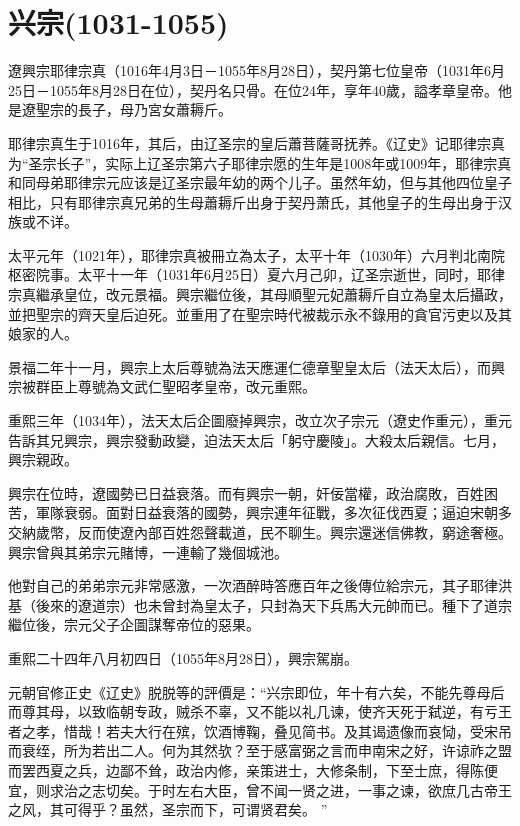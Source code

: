 
\section{兴宗\tiny(1031-1055)}

遼興宗耶律宗真（1016年4月3日－1055年8月28日），契丹第七位皇帝（1031年6月25日－1055年8月28日在位），契丹名只骨。在位24年，享年40歲，謚孝章皇帝。他是遼聖宗的長子，母乃宮女蕭耨斤。

耶律宗真生于1016年，其后，由辽圣宗的皇后蕭菩薩哥抚养。《辽史》记耶律宗真为“圣宗长子”，实际上辽圣宗第六子耶律宗愿的生年是1008年或1009年，耶律宗真和同母弟耶律宗元应该是辽圣宗最年幼的两个儿子。虽然年幼，但与其他四位皇子相比，只有耶律宗真兄弟的生母蕭耨斤出身于契丹萧氏，其他皇子的生母出身于汉族或不详。

太平元年（1021年），耶律宗真被冊立為太子，太平十年（1030年）六月判北南院枢密院事。太平十一年（1031年6月25日）夏六月己卯，辽圣宗逝世，同时，耶律宗真繼承皇位，改元景福。興宗繼位後，其母順聖元妃蕭耨斤自立為皇太后攝政，並把聖宗的齊天皇后迫死。並重用了在聖宗時代被裁示永不錄用的貪官污吏以及其娘家的人。

景福二年十一月，興宗上太后尊號為法天應運仁德章聖皇太后（法天太后），而興宗被群臣上尊號為文武仁聖昭孝皇帝，改元重熙。

重熙三年（1034年），法天太后企圖廢掉興宗，改立次子宗元（遼史作重元），重元告訴其兄興宗，興宗發動政變，迫法天太后「躬守慶陵」。大殺太后親信。七月，興宗親政。

興宗在位時，遼國勢已日益衰落。而有興宗一朝，奸佞當權，政治腐敗，百姓困苦，軍隊衰弱。面對日益衰落的國勢，興宗連年征戰，多次征伐西夏；逼迫宋朝多交納歲幣，反而使遼內部百姓怨聲載道，民不聊生。興宗還迷信佛教，窮途奢極。興宗曾與其弟宗元賭博，一連輸了幾個城池。

他對自己的弟弟宗元非常感激，一次酒醉時答應百年之後傳位給宗元，其子耶律洪基（後來的遼道宗）也未曾封為皇太子，只封為天下兵馬大元帥而已。種下了道宗繼位後，宗元父子企圖謀奪帝位的惡果。

重熙二十四年八月初四日（1055年8月28日），興宗駕崩。

元朝官修正史《辽史》脱脱等的評價是：“兴宗即位，年十有六矣，不能先尊母后而尊其母，以致临朝专政，贼杀不辜，又不能以礼几谏，使齐天死于弑逆，有亏王者之孝，惜哉！若夫大行在殡，饮酒博鞠，叠见简书。及其谒遗像而哀恸，受宋吊而衰绖，所为若出二人。何为其然欤？至于感富弼之言而申南宋之好，许谅祚之盟而罢西夏之兵，边鄙不耸，政治内修，亲策进士，大修条制，下至士庶，得陈便宜，则求治之志切矣。于时左右大臣，曾不闻一贤之进，一事之谏，欲庶几古帝王之风，其可得乎？虽然，圣宗而下，可谓贤君矣。 ”

